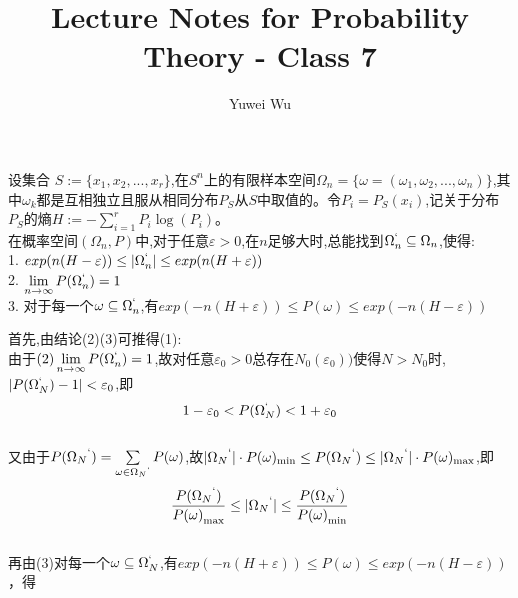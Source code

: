 

\title{Lecture Notes for Probability Theory - Class 7}
\author{Yuwei Wu}
\date{}

	\maketitle
	\newpage
	\begin{thm} 
		\mbox{}\par
		\noindent 设集合 $S:=\{x_1,x_2,...,x_r\}$,在$S^n$上的有限样本空间$\Omega_n  = \{ \omega  = ({\omega _1},{\omega _2},...,\omega_n)\}$,其中$\omega_k$都是互相独立且服从相同分布$P_S$从$S$中取值的。令$P_i=P_S(x_i)$,记关于分布$P_S$的熵${H} :=  - \sum\limits_{i = 1}^r {{P_i}\log ({P_i})}$。\\
		在概率空间$(\Omega_n,P)$中,对于任意$\varepsilon > 0$,在$n$足够大时,总能找到$\Omega_n^`\subseteq \Omega_n$,使得:\\
		1. $exp(n(H-\varepsilon)) \le |\Omega_n^`| \le exp(n(H+\varepsilon))$\\
		2. $\mathop {\lim }\limits_{n \to \infty } P(\Omega _n^`) = 1$\\
		3. 对于每一个$\omega \subseteq \Omega_n^`$,有$exp(-n(H+\varepsilon)) \le P(\omega)\le exp(-n(H-\varepsilon))$\\
		\proof
		\mbox{}\par
		\noindent 首先,由结论(2)(3)可推得(1):\\
		由于$(2)\mathop {\lim }\limits_{n \to \infty } P(\Omega _n^`) =1$,故对任意$\varepsilon_0>0$总存在$N_0(\varepsilon_0))$使得$N>N_0$时,$|P(\Omega_N^`)-1|<\varepsilon_0$,即$$1-\varepsilon_0<P(\Omega_N^`)<1+\varepsilon_0$$\\
		又由于$P({\Omega _N}^`) = \sum\limits_{\omega  \in {\Omega _N}^`} {P(\omega )} $,故$|{\Omega _N}^`| \cdot P{(\omega )_{\min }} \le P({\Omega _N}^`) \le |{\Omega _N}^`| \cdot P{(\omega )_{\max }}$,即$$\frac{{P({\Omega _N}^`)}}{{P{{(\omega )}_{\max }}}} \le |{\Omega _N}^`| \le \frac{{P({\Omega _N}^`)}}{{P{{(\omega )}_{\min }}}}$$\\
		再由(3)对每一个$\omega \subseteq \Omega_N^`$,有$exp(-n(H+\varepsilon)) \le P(\omega)\le exp(-n(H-\varepsilon))$，得\\

\end{thm}
